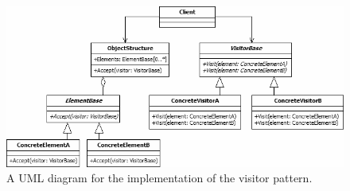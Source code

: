 \begin{figure}[!ht]
\centering
 \includegraphics[width=1\textwidth]{figures/VisitorPattern.png} %
\caption{A UML diagram for the implementation of the visitor pattern.}\label{image:visitor}
\vspace{-15pt}
\end{figure}


